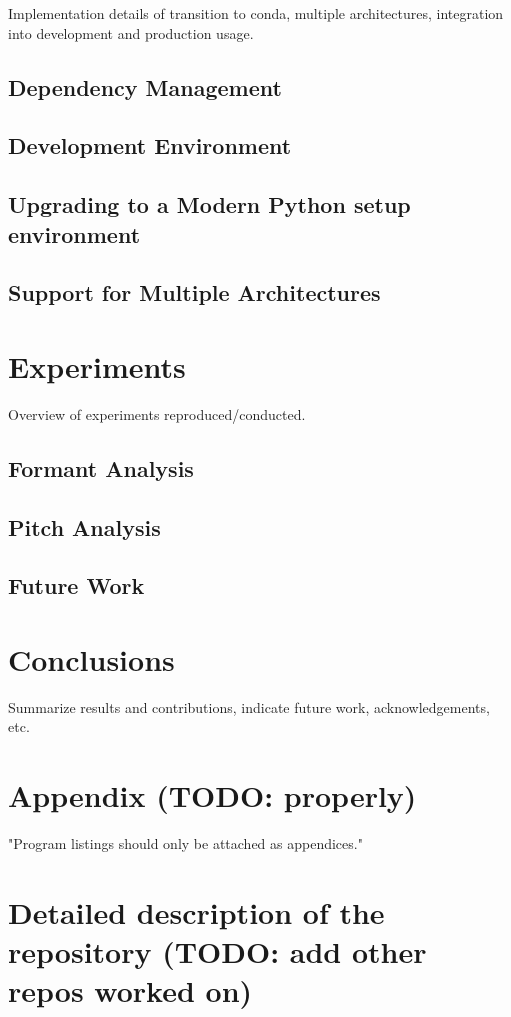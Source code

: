\documentclass[twoside,11pt]{article}
\begin{document}
Implementation details of transition to conda, multiple architectures, integration into development and production usage.
\subsection{Dependency Management}
\subsection{Development Environment}
\subsection{Upgrading to a Modern Python setup environment}
\subsection{Support for Multiple Architectures}

\section{Experiments}

Overview of experiments reproduced/conducted.

\subsection{Formant Analysis}
\subsection{Pitch Analysis}
\subsection{Future Work}

\section{Conclusions}

Summarize results and contributions, indicate future work, acknowledgements, etc.

\section{Appendix (TODO: properly)}

"Program listings should only be attached as appendices."

\section{Detailed description of the repository (TODO: add other repos worked on)}
\label{sec:repository}
\end{document}
